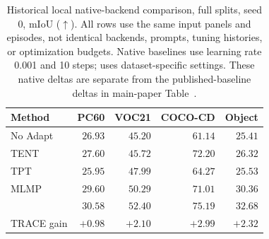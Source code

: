 \begin{table}[ht]
\caption{Historical local native-backend comparison, full splits, seed 0, mIoU ($\uparrow$). All rows use the same input panels and episodes, not identical backends, prompts, tuning histories, or optimization budgets. Native baselines use learning rate 0.001 and 10 steps; \method{} uses dataset-specific settings. These native deltas are separate from the published-baseline deltas in main-paper Table~.}
\label{tab:native}
\centering\small
\begin{tabular}{@{}lrrrr@{}}
\toprule
Method & PC60 & VOC21 & COCO-CD & Object \\
\midrule
No Adapt & $26.93$ & $45.20$ & $61.14$ & $25.41$ \\
TENT & $27.60$ & $45.72$ & $72.20$ & $26.32$ \\
TPT & $25.95$ & $47.99$ & $64.27$ & $25.53$ \\
MLMP & $29.60$ & $50.29$ & $71.01$ & $30.36$ \\
\midrule
\method{} & $\mathbf{30.58}$ & $\mathbf{52.40}$ & $\mathbf{75.19}$ & $\mathbf{32.68}$ \\
TRACE gain & $+0.98$ & $+2.10$ & $+2.99$ & $+2.32$ \\
\bottomrule
\end{tabular}
\end{table}
